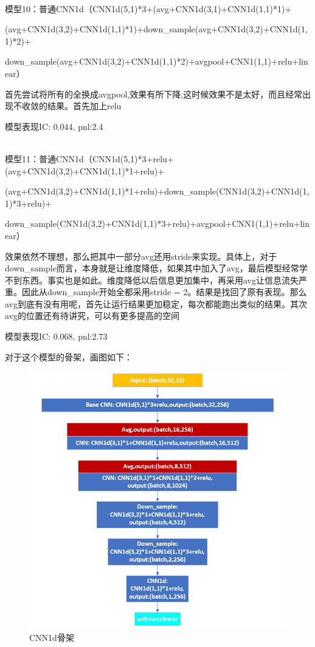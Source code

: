 \documentclass[11pt]{ctexart}
\begin{document}
~\\
模型10：普通CNN1d（CNN1d(5,1)*3+(avg+CNN1d(3,1)+CNN1d(1,1)*1)+

(avg+CNN1d(3,2)+CNN1d(1,1)*1)+down\_sample(avg+CNN1d(3,2)+CNN1d(1,1)*2)+

down\_sample(avg+CNN1d(3,2)+CNN1d(1,1)*2)+avgpool+CNN1(1,1)+relu+linear）

首先尝试将所有的全换成avgpool,效果有所下降,这时候效果不是太好，而且经常出现不收敛的结果。首先加上relu

模型表现{\kaishu \small IC: 0.044, pnl:2.4}

~\\
模型11：普通CNN1d（CNN1d(5,1)*3+relu+(avg+CNN1d(3,2)+CNN1d(1,1)*1+relu)+

(avg+CNN1d(3,2)+CNN1d(1,1)*1+relu)+down\_sample(CNN1d(3,2)+CNN1d(1,1)*3+relu)+

down\_sample(CNN1d(3,2)+CNN1d(1,1)*3+relu)+avgpool+CNN1(1,1)+relu+linear）

效果依然不理想，那么把其中一部分avg还用stride来实现。具体上，对于down\_sample而言，本身就是让维度降低，如果其中加入了avg，最后模型经常学不到东西。事实也是如此。维度降低以后信息更加集中，再采用avg让信息流失严重。因此从down\_sample开始全都采用stride = 2。结果是找回了原有表现。那么avg到底有没有用呢，首先让运行结果更加稳定，每次都能跑出类似的结果。其次avg的位置还有待讲究，可以有更多提高的空间

模型表现{\kaishu \small IC: 0.068, pnl:2.73}

对于这个模型的骨架，画图如下：
\begin{figure}[H]

\begin{center}
\includegraphics[width=1.0\textwidth]{4.PNG}
\end{center}
\caption{CNN1d骨架}
\label{FIG.4}
\end{figure}
\end{document}
